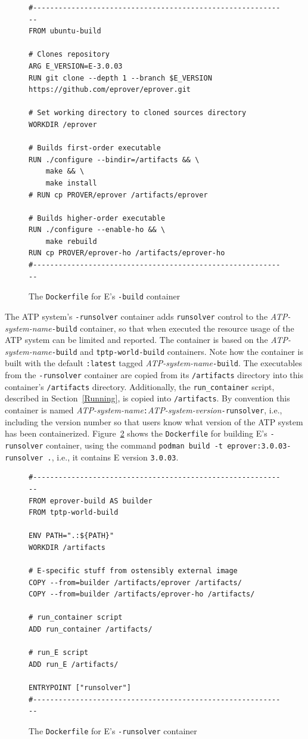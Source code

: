 \documentclass{easychair}
\begin{document}
\begin{figure}[htb]
{\small
\begin{verbatim}
#------------------------------------------------------------
FROM ubuntu-build

# Clones repository
ARG E_VERSION=E-3.0.03
RUN git clone --depth 1 --branch $E_VERSION https://github.com/eprover/eprover.git

# Set working directory to cloned sources directory
WORKDIR /eprover

# Builds first-order executable
RUN ./configure --bindir=/artifacts && \
    make && \
    make install
# RUN cp PROVER/eprover /artifacts/eprover

# Builds higher-order executable
RUN ./configure --enable-ho && \
    make rebuild
RUN cp PROVER/eprover-ho /artifacts/eprover-ho
#------------------------------------------------------------
\end{verbatim}
}
\caption{The {\tt Dockerfile} for E's {\tt -build} container}
\label{E---build}
\end{figure}

The ATP system's {\tt -runsolver} container adds {\tt runsolver} control to the 
{\em ATP-system-name}{\tt-build} container, so that when executed the resource usage of the
ATP system can be limited and reported.
The container is based on the {\em ATP-system-name}{\tt-build} and {\tt tptp-world-build}
containers.
Note how the container is built with the default {\tt :latest} tagged 
{\em ATP-system-name}{\tt-build}. 
The executables from the {\tt -runsolver} container are copied from its {\tt /artifacts}
directory into this container's {\tt /artifacts} directory.
Additionally, the {\tt run\_container} script, described in Section~\ref{Running}, is copied into
{\tt /artifacts}.
By convention this container is named
{\em ATP-system-name}{\tt :}{\em ATP-system-version}{\tt -runsolver}, i.e., including the version
number so that users know what version of the ATP system has been containerized.
Figure~\ref{E---runsolver} shows the {\tt Dockerfile} for building E's {\tt -runsolver}
container, using the command {\tt podman build -t eprover:3.0.03-runsolver .}, i.e., it contains
E version {\tt 3.0.03}.

\begin{figure}[htb]
{\small
\begin{verbatim}
#------------------------------------------------------------
FROM eprover-build AS builder
FROM tptp-world-build

ENV PATH=".:${PATH}"
WORKDIR /artifacts

# E-specific stuff from ostensibly external image
COPY --from=builder /artifacts/eprover /artifacts/
COPY --from=builder /artifacts/eprover-ho /artifacts/

# run_container script 
ADD run_container /artifacts/

# run_E script 
ADD run_E /artifacts/

ENTRYPOINT ["runsolver"]
#------------------------------------------------------------
\end{verbatim}
}
\caption{The {\tt Dockerfile} for E's {\tt -runsolver} container}
\label{E---runsolver}
\end{figure}
\end{document}
